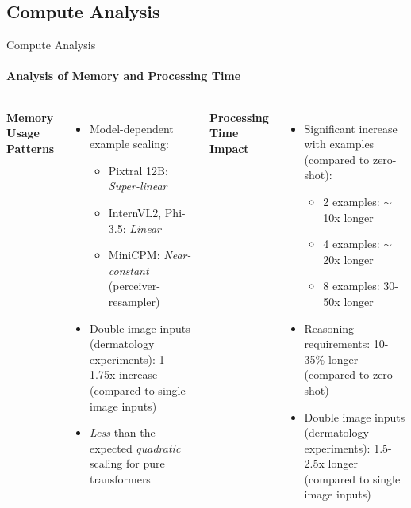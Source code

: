 \subsection{Compute Analysis}
\begin{frame}{Compute Analysis}
\framesubtitle{Analysis of Memory and Processing Time}
  \vspace{-1em}
  \begin{columns}[T]
    \column{\customcolumnwidth}
      \textbf{Memory Usage Patterns}
      \begin{itemize}
        \item Model-dependent example scaling:
        \vspace{-1.2em}
        \begin{itemize}
          \item Pixtral 12B: \emph{Super-linear}
          \item InternVL2, Phi-3.5: \emph{Linear}
          \item MiniCPM: \emph{Near-constant} (perceiver-resampler)
        \end{itemize}
        \item Double image inputs (dermatology experiments): 1-1.75x increase (compared to single image inputs)
        \item \emph{Less} than the expected \emph{quadratic} scaling for pure transformers~
      \end{itemize}
    \column{\customcolumnwidth}
      \textbf{Processing Time Impact}
      \begin{itemize}
        \item Significant increase with examples (compared to zero-shot):
        \vspace{-1.2em}
        \begin{itemize}
          \item 2 examples: \(\sim\)10x longer
          \item 4 examples: \(\sim\)20x longer
          \item 8 examples: 30-50x longer
        \end{itemize}
        \item Reasoning requirements: 10-35\% longer (compared to zero-shot)
        \item Double image inputs (dermatology experiments): 1.5-2.5x longer (compared to single image inputs)
      \end{itemize}
  \end{columns}
\end{frame}
